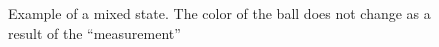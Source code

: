 \begin{figure}
\centering



\caption{Example of a mixed state. The color of the ball does not change as a result of the ``measurement''}
\label{figAddMixStateExample}
\end{figure}
